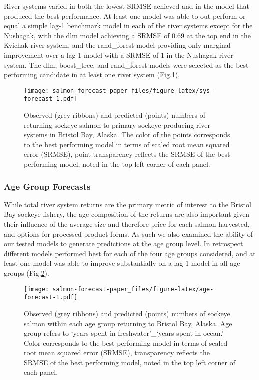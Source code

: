 \documentclass[
]{article}
\begin{document}
River systems varied in both the lowest SRMSE achieved and in the model that produced the best performance. At least one model was able to out-perform or equal a simple lag-1 benchmark model in each of the river systems except for the Nushagak, with the dlm model achieving a SRMSE of 0.69 at the top end in the Kvichak river system, and the rand\_forest model providing only marginal improvement over a lag-1 model with a SRMSE of 1 in the Nushagak river system. The dlm, boost\_tree, and rand\_forest models were selected as the best performing candidate in at least one river system (Fig.\ref{fig:sys-forecast}).

\begin{figure}
\centering
\texttt{[image: salmon-forecast-paper\_files/figure-latex/sys-forecast-1.pdf]}
\caption{\label{fig:sys-forecast}Observed (grey ribbons) and predicted (points) numbers of returning sockeye salmon to primary sockeye-producing river systems in Bristol Bay, Alaska. The color of the points corresponds to the best performing model in terms of scaled root mean squared error (SRMSE), point transparency reflects the SRMSE of the best performing model, noted in the top left corner of each panel.}
\end{figure}

\hypertarget{age-group-forecasts}{%
\subsubsection*{Age Group Forecasts}\label{age-group-forecasts}}

While total river system returns are the primary metric of interest to the Bristol Bay sockeye fishery, the age composition of the returns are also important given their influence of the average size and therefore price for each salmon harvested, and options for processed product forms. As such we also examined the ability of our tested models to generate predictions at the age group level. In retrospect different models performed best for each of the four age groups considered, and at least one model was able to improve substantially on a lag-1 model in all age groups (Fig.\ref{fig:age-forecast}).

\begin{figure}
\centering
\texttt{[image: salmon-forecast-paper\_files/figure-latex/age-forecast-1.pdf]}
\caption{\label{fig:age-forecast}Observed (grey ribbons) and predicted (points) numbers of sockeye salmon within each age group returning to Bristol Bay, Alaska. Age group refers to `years spent in freshwater'\_`years spent in ocean.' Color corresponds to the best performing model in terms of scaled root mean squared error (SRMSE), transparency reflects the SRMSE of the best performing model, noted in the top left corner of each panel.}
\end{figure}
\end{document}
